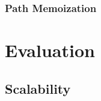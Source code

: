 \documentclass[10pt,sigconf,letterpaper,anonymous,nonacm]{acmart}
\begin{document}
\subsubsection{Path Memoization}





\section{Evaluation}
\subsection{Scalability}
\end{document}
